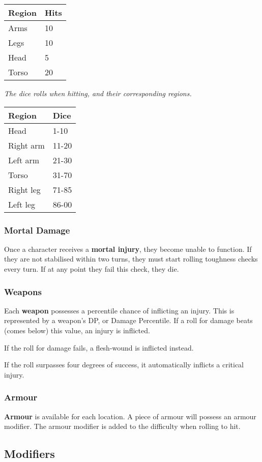\documentclass[12pt,]{article}
\begin{document}
\begin{longtable}[]{@{}ll@{}}
\toprule
Region & Hits\tabularnewline
\midrule
\endhead
Arms & 10\tabularnewline
Legs & 10\tabularnewline
Head & 5\tabularnewline
Torso & 20\tabularnewline
\bottomrule
\end{longtable}

\emph{The dice rolls when hitting, and their corresponding regions.}

\begin{longtable}[]{@{}ll@{}}
\toprule
Region & Dice\tabularnewline
\midrule
\endhead
Head & 1-10\tabularnewline
Right arm & 11-20\tabularnewline
Left arm & 21-30\tabularnewline
Torso & 31-70\tabularnewline
Right leg & 71-85\tabularnewline
Left leg & 86-00\tabularnewline
\bottomrule
\end{longtable}

\subsubsection{Mortal Damage}\label{mortal-damage}

Once a character receives a \textbf{mortal injury}, they become unable
to function. If they are not stabilised within two turns, they must
start rolling toughness checks every turn. If at any point they fail
this check, they die.

\subsubsection{Weapons}\label{weapons}

Each \textbf{weapon} possesses a percentile chance of inflicting an
injury. This is represented by a weapon's DP, or Damage Percentile. If a
roll for damage beats (comes below) this value, an injury is inflicted.

If the roll for damage fails, a flesh-wound is inflicted instead.

If the roll surpasses four degrees of success, it automatically inflicts
a critical injury.

\subsubsection{Armour}\label{armour}

\textbf{Armour} is available for each location. A piece of armour will
possess an armour modifier. The armour modifier is added to the
difficulty when rolling to hit.

\subsection{Modifiers}\label{modifiers}
\end{document}
